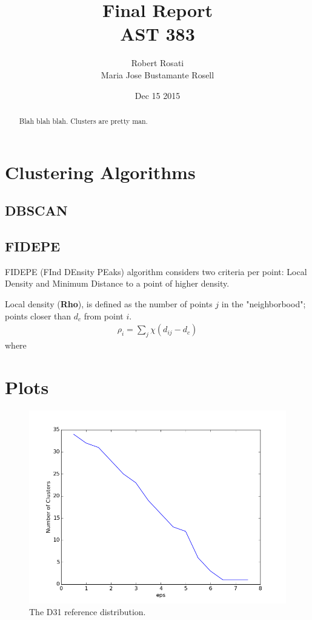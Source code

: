\documentclass[12pt]{article}
\begin{document}
\singlespacing
\title{Final Report\\
AST 383}
\date{Dec 15 2015}
\author{Robert Rosati \\ Maria Jose Bustamante Rosell}
\maketitle

\begin{abstract}
\par Blah blah blah. Clusters are pretty man.
\end{abstract}

\doublespacing

\section{Clustering Algorithms}

\subsection{DBSCAN}

\subsection{FIDEPE}

FIDEPE (FInd DEnsity PEaks) algorithm \cite{FIDEPE} considers two criteria per point: Local Density and Minimum Distance to a point of higher density.

Local density (\textbf{Rho}), is defined as the number of points $j$ in the "neighborbood"; points closer than $d_c$ from point $i$.
\begin{align*}
	\rho_i = \sum_j \chi(d_{ij}-d_c)
\end{align*}
 where 

\section{Plots}

\begin{figure}[ht]
\centering
\includegraphics[scale=0.8]{plots/D31_eps}
\caption{The D31 reference distribution.}
\label{fig:panmotor}
\end{figure}


\clearpage


\end{document}
